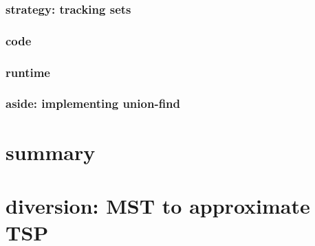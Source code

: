 

\subsubsection{strategy: tracking sets}



\subsubsection{code}



\subsubsection{runtime}



\subsubsection{aside: implementing union-find}
%



\section{summary}



\section{diversion: MST to approximate TSP}


